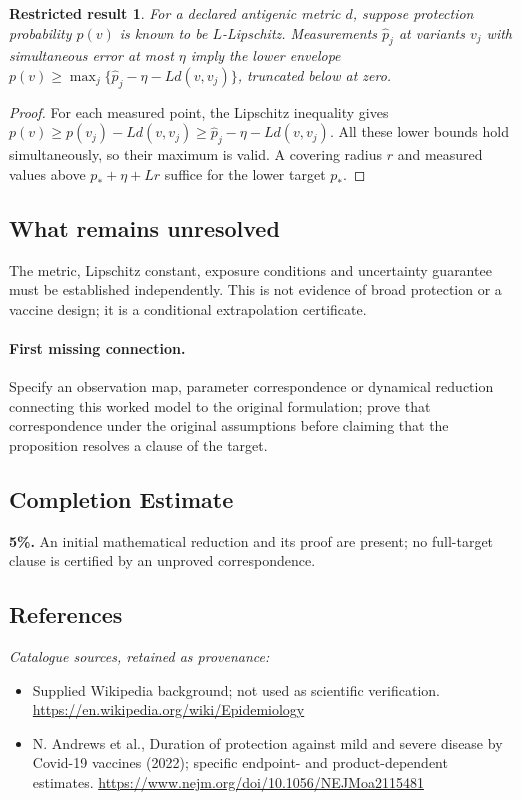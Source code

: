 \documentclass[11pt]{article}
\newtheorem{attemptresult}{Restricted result}[section]
\begin{document}
\begin{attemptresult}
For a declared antigenic metric $d$, suppose protection probability $p(v)$ is known to be $L$-Lipschitz. Measurements $\widehat p_j$ at variants $v_j$ with simultaneous error at most $\eta$ imply the lower envelope $p(v)\geq\max_j\{\widehat p_j-\eta-Ld(v,v_j)\}$, truncated below at zero.
\end{attemptresult}
\begin{proof}
For each measured point, the Lipschitz inequality gives $p(v)\geq p(v_j)-Ld(v,v_j)\geq\widehat p_j-\eta-Ld(v,v_j)$. All these lower bounds hold simultaneously, so their maximum is valid. A covering radius $r$ and measured values above $p_*+\eta+Lr$ suffice for the lower target $p_*$.
\end{proof}
\subsection{What remains unresolved}
The metric, Lipschitz constant, exposure conditions and uncertainty guarantee must be established independently. This is not evidence of broad protection or a vaccine design; it is a conditional extrapolation certificate.
\paragraph{First missing connection.} Specify an observation map, parameter correspondence or dynamical reduction connecting this worked model to the original formulation; prove that correspondence under the original assumptions before claiming that the proposition resolves a clause of the target.
\subsection{Completion Estimate}
\textbf{5\%.} An initial mathematical reduction and its proof are present; no full-target clause is certified by an unproved correspondence.
\subsection{References}
\noindent\emph{Catalogue sources, retained as provenance:}
\begin{itemize}
\item Supplied Wikipedia background; not used as scientific verification. \url{https://en.wikipedia.org/wiki/Epidemiology}
\item N. Andrews et al., Duration of protection against mild and severe disease by Covid-19 vaccines (2022); specific endpoint- and product-dependent estimates. \url{https://www.nejm.org/doi/10.1056/NEJMoa2115481}
\end{itemize}
\clearpage
\end{document}
